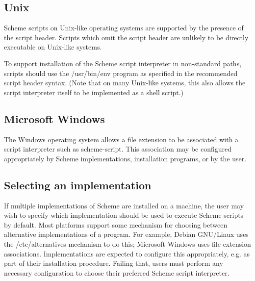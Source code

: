 \subsection{Unix}
Scheme scripts on Unix-like operating systems are supported by the 
presence of the script header.  Scripts which omit the script header 
are unlikely to be directly executable on Unix-like systems.

To support installation of the Scheme script interpreter in 
non-standard paths, scripts should use the {\cf /usr/bin/env} 
program as specified in the recommended script header syntax.  
(Note that on many Unix-like systems, this also allows the 
script interpreter itself to be implemented as a shell script.)

\subsection{Microsoft Windows}
The Windows operating system allows a file extension to be associated 
with a script interpreter such as {\cf scheme-script}.  This 
association may be configured appropriately by Scheme implementations, 
installation programs, or by the user.

\subsection{Selecting an implementation}
If multiple implementations of Scheme are installed on a machine, the
user may wish to specify which implementation should be used to 
execute Scheme scripts by default.  Most platforms support some 
mechanism for choosing between alternative implementations of a 
program.  For example, Debian GNU/Linux uses the {\cf /etc/alternatives} 
mechanism to do this; Microsoft Windows uses file extension 
associations.  Implementations are expected to configure this 
appropriately, e.g. as part of their installation procedure.
Failing that, users must perform any necessary configuration to 
choose their preferred Scheme script interpreter.

